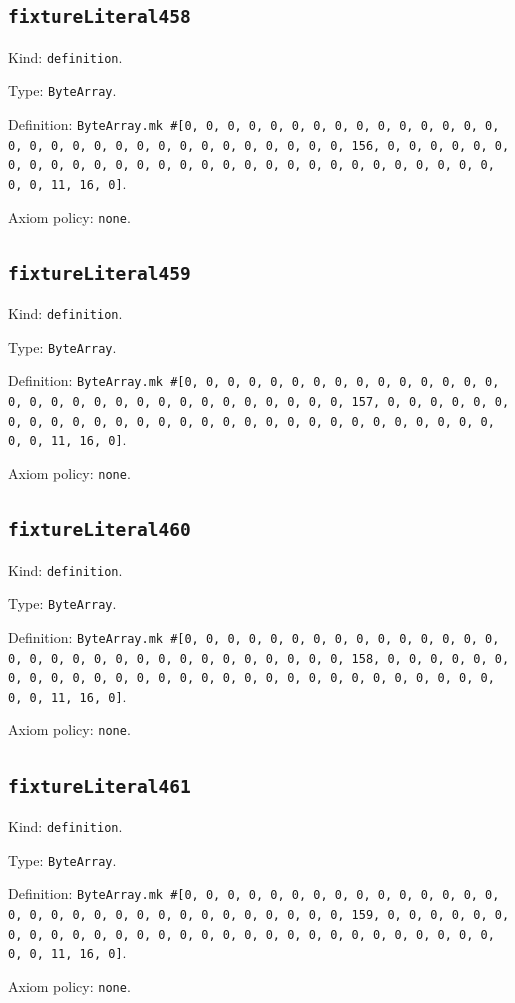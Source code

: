 \documentclass[11pt]{article}
\begin{document}
\subsection*{\texttt{fixtureLiteral458}}
\noindent Kind: \texttt{definition}.\par
\noindent Type: \texttt{ByteArray}.\par
\noindent Definition: \texttt{ByteArray.mk \#[0, 0, 0, 0, 0, 0, 0, 0, 0, 0, 0, 0, 0, 0, 0, 0, 0, 0, 0, 0, 0, 0, 0, 0, 0, 0, 0, 0, 0, 0, 0, 156, 0, 0, 0, 0, 0, 0, 0, 0, 0, 0, 0, 0, 0, 0, 0, 0, 0, 0, 0, 0, 0, 0, 0, 0, 0, 0, 0, 0, 0, 0, 0, 11, 16, 0]}.\par
\noindent Axiom policy: \texttt{none}.\par
\subsection*{\texttt{fixtureLiteral459}}
\noindent Kind: \texttt{definition}.\par
\noindent Type: \texttt{ByteArray}.\par
\noindent Definition: \texttt{ByteArray.mk \#[0, 0, 0, 0, 0, 0, 0, 0, 0, 0, 0, 0, 0, 0, 0, 0, 0, 0, 0, 0, 0, 0, 0, 0, 0, 0, 0, 0, 0, 0, 0, 157, 0, 0, 0, 0, 0, 0, 0, 0, 0, 0, 0, 0, 0, 0, 0, 0, 0, 0, 0, 0, 0, 0, 0, 0, 0, 0, 0, 0, 0, 0, 0, 11, 16, 0]}.\par
\noindent Axiom policy: \texttt{none}.\par
\subsection*{\texttt{fixtureLiteral460}}
\noindent Kind: \texttt{definition}.\par
\noindent Type: \texttt{ByteArray}.\par
\noindent Definition: \texttt{ByteArray.mk \#[0, 0, 0, 0, 0, 0, 0, 0, 0, 0, 0, 0, 0, 0, 0, 0, 0, 0, 0, 0, 0, 0, 0, 0, 0, 0, 0, 0, 0, 0, 0, 158, 0, 0, 0, 0, 0, 0, 0, 0, 0, 0, 0, 0, 0, 0, 0, 0, 0, 0, 0, 0, 0, 0, 0, 0, 0, 0, 0, 0, 0, 0, 0, 11, 16, 0]}.\par
\noindent Axiom policy: \texttt{none}.\par
\subsection*{\texttt{fixtureLiteral461}}
\noindent Kind: \texttt{definition}.\par
\noindent Type: \texttt{ByteArray}.\par
\noindent Definition: \texttt{ByteArray.mk \#[0, 0, 0, 0, 0, 0, 0, 0, 0, 0, 0, 0, 0, 0, 0, 0, 0, 0, 0, 0, 0, 0, 0, 0, 0, 0, 0, 0, 0, 0, 0, 159, 0, 0, 0, 0, 0, 0, 0, 0, 0, 0, 0, 0, 0, 0, 0, 0, 0, 0, 0, 0, 0, 0, 0, 0, 0, 0, 0, 0, 0, 0, 0, 11, 16, 0]}.\par
\noindent Axiom policy: \texttt{none}.\par
\end{document}
